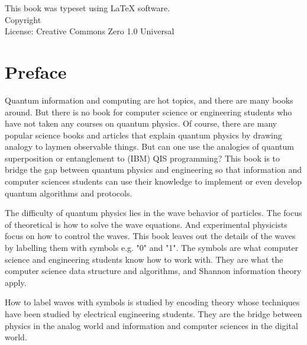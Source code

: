 \documentclass{book}
\makeatletter
\newcommand{\booklicense}{Creative Commons Zero 1.0 Universal}
\newcommand{\bookauthor}{\@author}
\makeatother
\begin{document}
\thispagestyle{empty}

\begin{flushleft}
\vspace*{\fill}
This book was typeset using \LaTeX{} software.\\
\vspace{\fill}
Copyright \textcopyright{} \the\year{}  \bookauthor\\
License: \booklicense
\end{flushleft}

\addtocounter{page}{2}

\chapter*{Preface}
Quantum information and computing are hot topics, and there are many books around. But there is no book for computer science or engineering students who have not taken any courses on quantum physics. Of course, there are many popular science books and articles that explain quantum physics by drawing analogy to laymen observable things. But can one use the analogies of quantum superposition or entanglement to (IBM) QIS programming? This book is to bridge the gap between quantum physics and engineering so that information and computer sciences students can use their knowledge to implement or even develop quantum algorithms and protocols.

The difficulty of quantum physics lies in the wave behavior of particles. The focus of theoretical is how to solve the wave equations. And experimental physicists focus on how to control the waves. This book leaves out the details of the waves by labelling them with symbols e.g. "0" and "1". The symbols are what computer science and engineering students know how to work with. They are what the computer science data structure and algorithms, and Shannon information theory apply.

How to label waves with symbols is studied by encoding theory whose techniques have been studied by electrical engineering students. They are the bridge between physics in the analog world and information and computer sciences in the digital world.

\setcounter{tocdepth}{3}
\tableofcontents
\end{document}

